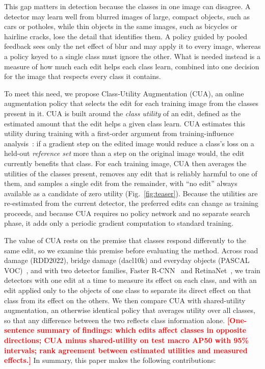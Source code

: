 \documentclass[conference]{IEEEtran}
\newcommand{\todo}[1]{\textcolor{red}{\textbf{[#1]}}}
\begin{document}
This gap matters in detection because the classes in one image can disagree. A detector may learn well from blurred images of large, compact objects, such as cars or potholes, while thin objects in the same images, such as bicycles or hairline cracks, lose the detail that identifies them. A policy guided by pooled feedback sees only the net effect of blur and may apply it to every image, whereas a policy keyed to a single class must ignore the other. What is needed instead is a measure of how much each edit helps each class learn, combined into one decision for the image that respects every class it contains.

To meet this need, we propose Class-Utility Augmentation (CUA), an online augmentation policy that selects the edit for each training image from the classes present in it. CUA is built around the \emph{class utility} of an edit, defined as the estimated amount that the edit helps a given class learn. CUA estimates this utility during training with a first-order argument from training-influence analysis~\cite{pruthi2020tracin}: if a gradient step on the edited image would reduce a class's loss on a held-out \emph{reference set} more than a step on the original image would, the edit currently benefits that class. For each training image, CUA then averages the utilities of the classes present, removes any edit that is reliably harmful to one of them, and samples a single edit from the remainder, with ``no edit'' always available as a candidate of zero utility (Fig.~\ref{fig:teaser}). Because the utilities are re-estimated from the current detector, the preferred edits can change as training proceeds, and because CUA requires no policy network and no separate search phase, it adds only a periodic gradient computation to standard training.

The value of CUA rests on the premise that classes respond differently to the same edit, so we examine this premise before evaluating the method. Across road damage (RDD2022), bridge damage (dacl10k) and everyday objects (PASCAL VOC)~\cite{everingham2010voc}, and with two detector families, Faster R-CNN~\cite{ren2017faster} and RetinaNet~\cite{lin2017focal}, we train detectors with one edit at a time to measure its effect on each class, and with an edit applied only to the objects of one class to separate its direct effect on that class from its effect on the others. We then compare CUA with shared-utility augmentation, an otherwise identical policy that averages utility over all classes, so that any difference between the two reflects class information alone. \todo{One-sentence summary of findings: which edits affect classes in opposite directions; CUA minus shared-utility on test macro AP50 with 95\% intervals; rank agreement between estimated utilities and measured effects.} In summary, this paper makes the following contributions:
\end{document}
